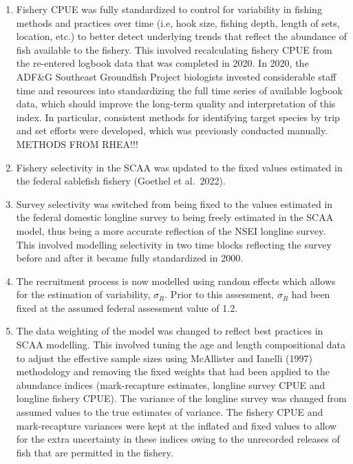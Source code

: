 \documentclass[
]{article}
\providecommand{\tightlist}{%
  \setlength{\itemsep}{0pt}\setlength{\parskip}{0pt}}
\begin{document}
\begin{enumerate}
\def\labelenumi{\arabic{enumi}.}
\tightlist
\item
  Fishery CPUE was fully standardized to control for variability in fishing methods and practices over time (i.e, hook size, fishing depth, length of sets, location, etc.) to better detect underlying trends that reflect the abundance of fish available to the fishery. This involved recalculating fishery CPUE from the re-entered logbook data that was completed in 2020. In 2020, the ADF\&G Southeast Groundfish Project biologists invested considerable staff time and resources into standardizing the full time series of available logbook data, which should improve the long-term quality and interpretation of this index. In particular, consistent methods for identifying target species by trip and set efforts were developed, which was previously conducted manually. {METHODS FROM RHEA!!!}
\item
  Fishery selectivity in the SCAA was updated to the fixed values estimated in the federal sablefish fishery (Goethel et al.~2022).\\
\item
  Survey selectivity was switched from being fixed to the values estimated in the federal domestic longline survey to being freely estimated in the SCAA model, thus being a more accurate reflection of the NSEI longline survey. This involved modelling selectivity in two time blocks reflecting the survey before and after it became fully standardized in 2000.
\item
  The recruitment process is now modelled using random effects which allows for the estimation of variability, \(\sigma_R\). Prior to this assessment, \(\sigma_R\) had been fixed at the assumed federal assessment value of 1.2.\\
\item
  The data weighting of the model was changed to reflect best practices in SCAA modelling. This involved tuning the age and length compositional data to adjust the effective sample sizes using McAllister and Ianelli (1997) methodology and removing the fixed weights that had been applied to the abundance indices (mark-recapture estimates, longline survey CPUE and longline fishery CPUE). The variance of the longline survey was changed from assumed values to the true estimates of variance. The fishery CPUE and mark-recapture variances were kept at the inflated and fixed values to allow for the extra uncertainty in these indices owing to the unrecorded releases of fish that are permitted in the fishery.
\end{enumerate}
\end{document}
